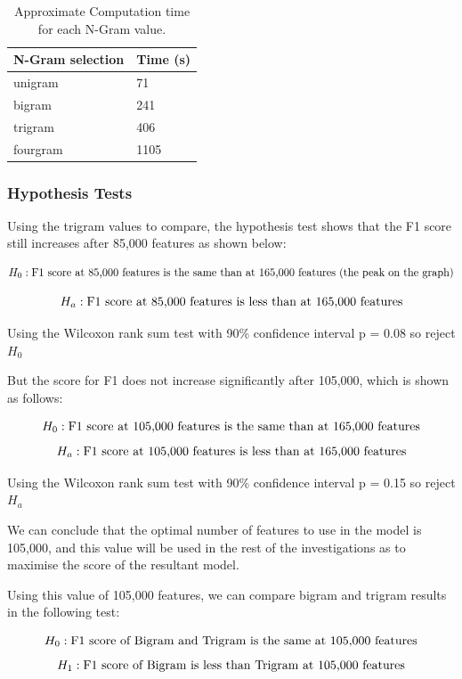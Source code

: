 \begin{table}
\centering
\caption{Approximate Computation time for each N-Gram value.}
\label{ngram:time}
\begin{tabular}{ |p{3cm}|p{3cm}|}
 \hline
  N-Gram selection & Time (s) \\
 \hline
  unigram & 71\\
  bigram & 241\\
  trigram & 406\\
  fourgram & 1105 \\
 \hline
\end{tabular}

\end{table}
\pagebreak

\subsubsection{Hypothesis Tests} 

Using the trigram values to compare, the hypothesis test shows that the F1 score still increases after 85,000 features as shown below:

$$ H_0:  \textnormal{F1 score at 85,000 features is the same than at 165,000 features (the peak on the graph)}$$

$$ H_a: \textnormal{F1 score at 85,000 features is less than at 165,000 features} $$

Using the Wilcoxon rank sum test with 90\% confidence interval 
p = 0.08 so reject $H_0$

But the score for F1 does not increase significantly after 105,000, which is shown as follows:

$$H_0: \textnormal{F1 score at 105,000 features is the same than at 165,000 features} $$
$$H_a: \textnormal{F1 score at 105,000 features is less than at 165,000 features}$$

Using the Wilcoxon rank sum test with 90\% confidence interval 
p = 0.15 so reject $H_a$


We can conclude that the optimal number of features to use in the model is 105,000, and this value will be used in the rest of the investigations as to maximise the score of the resultant model. 


Using this value of 105,000 features, we can compare bigram and trigram results in the following test:

$$ H_0: \textnormal{F1 score of Bigram and Trigram is the same at 105,000 features} $$
$$ H_1: \textnormal{F1 score of Bigram is less than Trigram at 105,000 features} $$

